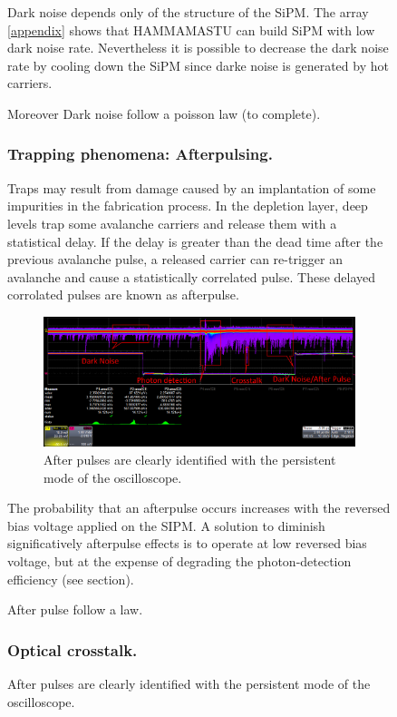 \documentclass[a4paper, 11pt]{report}%
\begin{document}
\begin{figure}[!hbtp]
  Dark noise depends only of the structure of the SiPM. The array \ref{appendix} shows that HAMMAMASTU can build SiPM with low dark noise rate. 
  Nevertheless it is possible to decrease the dark noise rate by cooling down the SiPM since darke noise is generated by 
  hot carriers.  
  
  Moreover Dark noise follow a poisson law (to complete).  
  
  \subsubsection{Trapping phenomena: Afterpulsing.}

  Traps may result from damage caused by an implantation of some impurities in the fabrication process. In the depletion layer, 
  deep levels trap some avalanche carriers and release them with 
  a statistical delay. If the delay is greater than the dead time after the previous avalanche pulse, a released carrier can
  re-trigger an avalanche and cause a statistically correlated pulse. These delayed corrolated pulses are known as afterpulse. 
  \\
  
  \begin{figure}[!hbtp]
  \centering
  \includegraphics[totalheight=0.22\textwidth,trim=0cm 6.5cm 0cm 0cm, clip=true]{Pictures/blabla/DN_AP_CT_1.png}
  \caption{After pulses are clearly identified with the persistent mode of the oscilloscope.}
  \label{fig:AP}
  \end{figure}
  
  The probability that an afterpulse occurs increases with the reversed bias voltage applied on the SIPM.  A solution to diminish 
  significatively afterpulse effects is 
  to operate at low reversed bias voltage, but at the expense of degrading the photon-detection efficiency (see section). 
    
  After pulse follow a law. 
  
  \subsubsection{Optical crosstalk.}
  

\end{figure}
\end{document}
